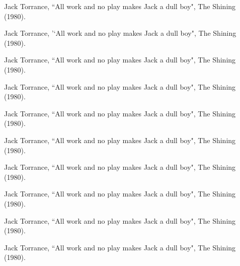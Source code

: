 	\item Jack Torrance, ``All work and no play makes Jack a dull boy", The Shining (1980).
	\item \hspace{5mm}Jack Torrance, '`All work and no play makes Jack a dull boy", The Shining (1980).
	\item \hspace{10mm}Jack Torrance, ``All work and no play makes Jack a dull boy", The Shining (1980).
	\item \hspace{15mm}Jack Torrance, ``All work and no play makes Jack a dull boy", The Shining (1980).
	\item \hspace{20mm}Jack Torrance, ``All work and no play makes Jack a dull boy", The Shining (1980).
	\item \hspace{25mm}Jack Torrance, ``All work and no play makes Jack a dull boy", The Shining (1980).
	\item \hspace{30mm}Jack Torrance, ``All work and no play makes Jack a dull boy", The Shining (1980).
	\item \hspace{25mm}Jack Torrance, ``All work and no play makes Jack a dull boy", The Shining (1980).
	\item \hspace{20mm}Jack Torrance, ``All work and no play makes Jack a dull boy", The Shining (1980).
	\item \hspace{15mm}Jack Torrance, ``All work and no play makes Jack a dull boy", The Shining (1980).
